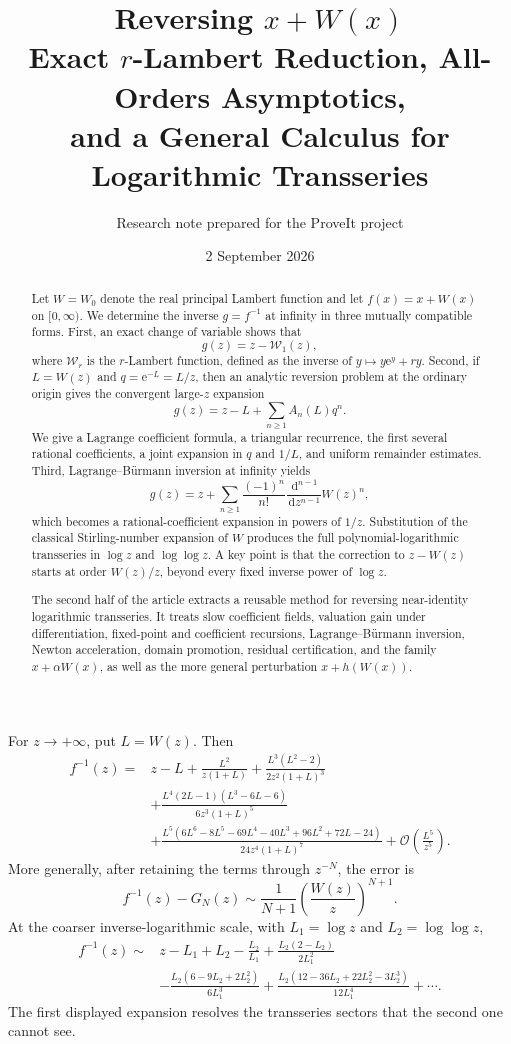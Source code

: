 \documentclass[11pt,a4paper]{article}
\title{\textbf{Reversing \(x+W(x)\)}\\[0.35em]
\Large Exact \(r\)-Lambert Reduction, All-Orders Asymptotics,\\
and a General Calculus for Logarithmic Transseries}
\author{Research note prepared for the ProveIt project}
\date{2 September 2026}
\numberwithin{equation}{section}
\theoremstyle{definition}
\theoremstyle{remark}
\newcommand{\e}{\mathrm e}
\newcommand{\dd}{\,\mathrm d}
\newcommand{\Ord}{\mathcal O}
\newcommand{\rW}{\mathcal W}
\newcommand{\Lone}{L_1}
\newcommand{\Ltwo}{L_2}
\newcommand{\Acoef}{A}
\begin{document}
\maketitle

\begin{abstract}
Let \(W=W_0\) denote the real principal Lambert function and let
\(f(x)=x+W(x)\) on \([0,\infty)\).  We determine the inverse
\(g=f^{-1}\) at infinity in three mutually compatible forms.  First, an
exact change of variable shows that
\[
  g(z)=z-\rW_1(z),
\]
where \(\rW_r\) is the \(r\)-Lambert function, defined as the inverse of
\(y\mapsto y\e^y+ry\).  Second, if \(L=W(z)\) and
\(q=\e^{-L}=L/z\), then an analytic reversion problem at the ordinary
origin gives the convergent large-\(z\) expansion
\[
  g(z)=z-L+\sum_{n\ge1}\Acoef_n(L)q^n.
\]
We give a Lagrange coefficient formula, a triangular recurrence, the first
several rational coefficients, a joint expansion in \(q\) and \(1/L\), and
uniform remainder estimates.  Third, Lagrange--B\"urmann inversion at
infinity yields
\[
  g(z)=z+\sum_{n\ge1}\frac{(-1)^n}{n!}
       \frac{\dd^{n-1}}{\dd z^{n-1}}W(z)^n,
\]
which becomes a rational-coefficient expansion in powers of \(1/z\).
Substitution of the classical Stirling-number expansion of \(W\) produces
the full polynomial-logarithmic transseries in \(\log z\) and
\(\log\log z\).  A key point is that the correction to \(z-W(z)\) starts
at order \(W(z)/z\), beyond every fixed inverse power of \(\log z\).

The second half of the article extracts a reusable method for reversing
near-identity logarithmic transseries.  It treats slow coefficient fields,
valuation gain under differentiation, fixed-point and coefficient
recursions, Lagrange--B\"urmann inversion, Newton acceleration, domain
promotion, residual certification, and the family
\(x+\alpha W(x)\), as well as the more general perturbation
\(x+h(W(x))\).
\end{abstract}

\begin{mainresultbox}
For \(z\to+\infty\), put \(L=W(z)\).  Then
\begin{align*}
 f^{-1}(z)={}&z-L
 +\frac{L^2}{z(1+L)}
 +\frac{L^3(L^2-2)}{2z^2(1+L)^3}\\
 &+\frac{L^4(2L-1)(L^3-6L-6)}{6z^3(1+L)^5}\\
 &+\frac{L^5(6L^6-8L^5-69L^4-40L^3+96L^2+72L-24)}
 {24z^4(1+L)^7}
 +\Ord\!\left(\frac{L^5}{z^5}\right).
\end{align*}
More generally, after retaining the terms through \(z^{-N}\), the error is
\[
 f^{-1}(z)-G_N(z)
 \sim \frac{1}{N+1}\left(\frac{W(z)}{z}\right)^{N+1}.
\]
At the coarser inverse-logarithmic scale, with
\(\Lone=\log z\) and \(\Ltwo=\log\log z\),
\begin{align*}
 f^{-1}(z)\sim{}&z-\Lone+\Ltwo-\frac{\Ltwo}{\Lone}
 +\frac{\Ltwo(2-\Ltwo)}{2\Lone^2}\\
 &-\frac{\Ltwo(6-9\Ltwo+2\Ltwo^2)}{6\Lone^3}
 +\frac{\Ltwo(12-36\Ltwo+22\Ltwo^2-3\Ltwo^3)}{12\Lone^4}
 +\cdots.
\end{align*}
The first displayed expansion resolves the transseries sectors that the
second one cannot see.
\end{mainresultbox}
\end{document}
